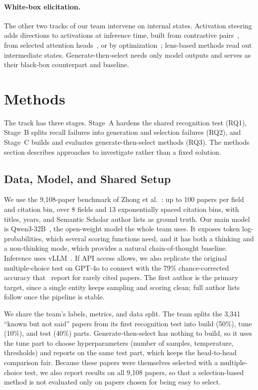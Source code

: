\documentclass[sigconf,nonacm]{acmart}
\begin{document}
\paragraph{White-box elicitation.}
The other two tracks of our team intervene on internal states. Activation steering adds directions to activations at inference time, built from contrastive pairs~\cite{rimsky2024caa}, from selected attention heads~\cite{li2023iti}, or by optimization~\cite{cao2024bipo}; lens-based methods read out intermediate states. Generate-then-select needs only model outputs and serves as their black-box counterpart and baseline.

\section{Methods}

The track has three stages. Stage~A hardens the shared recognition test (RQ1), Stage~B splits recall failures into generation and selection failures (RQ2), and Stage~C builds and evaluates generate-then-select methods (RQ3). The methods section describes approaches to investigate rather than a fixed solution.

\subsection{Data, Model, and Shared Setup}

We use the 9,108-paper benchmark of Zhong et al.~\cite{zhong2026dreaming}: up to 100 papers per field and citation bin, over 8 fields and 13 exponentially spaced citation bins, with titles, years, and Semantic Scholar author lists as ground truth. Our main model is Qwen3-32B~\cite{qwen3}, the open-weight model the whole team uses. It exposes token log-probabilities, which several scoring functions need, and it has both a thinking and a non-thinking mode, which provides a natural chain-of-thought baseline. Inference uses vLLM~\cite{kwon2023vllm}. If API access allows, we also replicate the original multiple-choice test on GPT-4o to connect with the 79\% chance-corrected accuracy that~\cite{zhong2026dreaming} report for rarely cited papers. The first author is the primary target, since a single entity keeps sampling and scoring clean; full author lists follow once the pipeline is stable.

We share the team's labels, metrics, and data split. The team splits the 3,341 ``known but not said'' papers from its first recognition test into build (50\%), tune (10\%), and test (40\%) parts. Generate-then-select has nothing to build, so it uses the tune part to choose hyperparameters (number of samples, temperature, thresholds) and reports on the same test part, which keeps the head-to-head comparison fair. Because these papers were themselves selected with a multiple-choice test, we also report results on all 9,108 papers, so that a selection-based method is not evaluated only on papers chosen for being easy to select.
\end{document}
